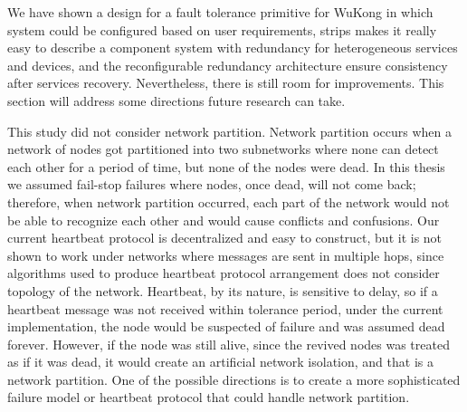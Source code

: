 

We have shown a design for a fault tolerance primitive for WuKong
in which system could be configured based on user requirements, strips makes it
really easy to describe a component system with redundancy for heterogeneous
services and devices, and the reconfigurable redundancy architecture ensure
consistency after services recovery. Nevertheless, there is still room for
improvements. This section will address some directions future research can
take.

This study did not consider network partition. Network partition occurs when
a network of nodes got partitioned into two subnetworks where none can detect
each other for a period of time, but none of the nodes were dead. In this thesis
we assumed fail-stop failures where nodes, once dead, will not come back;
therefore, when network partition occurred, each part of the network would not
be able to recognize each other and would cause conflicts and confusions.  Our
current heartbeat protocol is decentralized and easy to construct, but it is not
shown to work under networks where messages are sent in multiple hops, since
algorithms used to produce heartbeat protocol arrangement does not consider
topology of the network. Heartbeat, by its nature, is sensitive to delay, so if
a heartbeat message was not received within tolerance period, under the current
implementation, the node would be suspected of failure and was assumed dead
forever. However, if the node was still alive, since the revived nodes was
treated as if it was dead, it would create an artificial network isolation, and
that is a network partition. One of the possible directions is to create a more
sophisticated failure model or heartbeat protocol that could handle network
partition.


